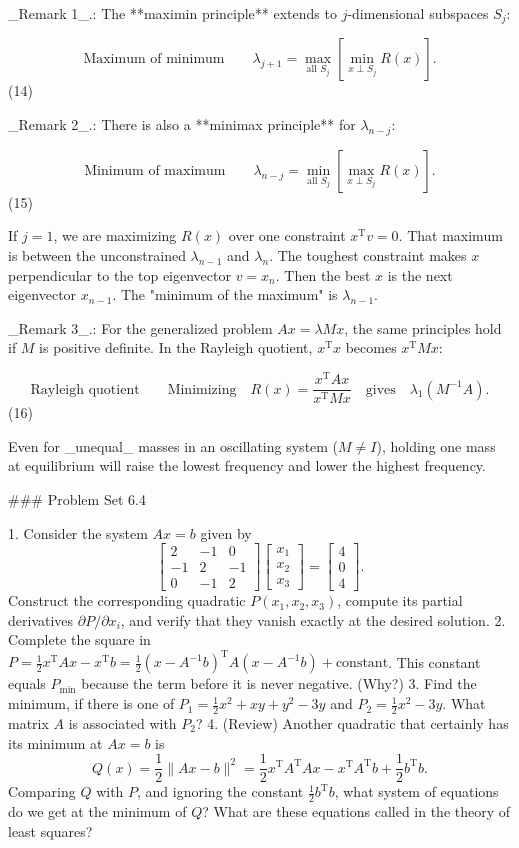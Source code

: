 _Remark 1_.: The **maximin principle** extends to \(j\)-dimensional subspaces \(S_{j}\):

\[\text{Maximum of minimum}\qquad\lambda_{j+1}=\max_{\text{all }S_{j}}\left[\min_{x \perp S_{j}}R(x)\right].\] (14)

_Remark 2_.: There is also a **minimax principle** for \(\lambda_{n-j}\):

\[\text{Minimum of maximum}\qquad\lambda_{n-j}=\min_{\text{all }S_{j}}\left[\max_{x \perp S_{j}}R(x)\right].\] (15)

If \(j=1\), we are maximizing \(R(x)\) over one constraint \(x^{\text{T}}v=0\). That maximum is between the unconstrained \(\lambda_{n-1}\) and \(\lambda_{n}\). The toughest constraint makes \(x\) perpendicular to the top eigenvector \(v=x_{n}\). Then the best \(x\) is the next eigenvector \(x_{n-1}\). The "minimum of the maximum" is \(\lambda_{n-1}\).

_Remark 3_.: For the generalized problem \(Ax=\lambda Mx\), the same principles hold if \(M\) is positive definite. In the Rayleigh quotient, \(x^{\text{T}}x\) becomes \(x^{\text{T}}Mx\):

\[\text{Rayleigh quotient}\qquad\text{Minimizing}\quad R(x)=\frac{x^{\text{T}}Ax }{x^{\text{T}}Mx}\quad\text{gives}\quad\lambda_{1}(M^{-1}A).\] (16)

Even for _unequal_ masses in an oscillating system (\(M\neq I\)), holding one mass at equilibrium will raise the lowest frequency and lower the highest frequency.

### Problem Set 6.4

1. Consider the system \(Ax=b\) given by \[\begin{bmatrix}2&-1&0\\ -1&2&-1\\ 0&-1&2\end{bmatrix}\begin{bmatrix}x_{1}\\ x_{2}\\ x_{3}\end{bmatrix}=\begin{bmatrix}4\\ 0\\ 4\end{bmatrix}.\] Construct the corresponding quadratic \(P(x_{1},x_{2},x_{3})\), compute its partial derivatives \(\partial P/\partial x_{i}\), and verify that they vanish exactly at the desired solution.
2. Complete the square in \(P=\frac{1}{2}x^{\text{T}}Ax-x^{\text{T}}b=\frac{1}{2}(x-A^{-1}b)^{\text{T}}A( x-A^{-1}b)+\text{constant}\). This constant equals \(P_{\text{min}}\) because the term before it is never negative. (Why?)
3. Find the minimum, if there is one of \(P_{1}=\frac{1}{2}x^{2}+xy+y^{2}-3y\) and \(P_{2}=\frac{1}{2}x^{2}-3y\). What matrix \(A\) is associated with \(P_{2}\)?
4. (Review) Another quadratic that certainly has its minimum at \(Ax=b\) is \[Q(x)=\frac{1}{2}\|Ax-b\|^{2}=\frac{1}{2}x^{\text{T}}A^{\text{T}}Ax-x^{\text{T} }A^{\text{T}}b+\frac{1}{2}b^{\text{T}}b.\] Comparing \(Q\) with \(P\), and ignoring the constant \(\frac{1}{2}b^{\text{T}}b\), what system of equations do we get at the minimum of \(Q\)? What are these equations called in the theory of least squares? 